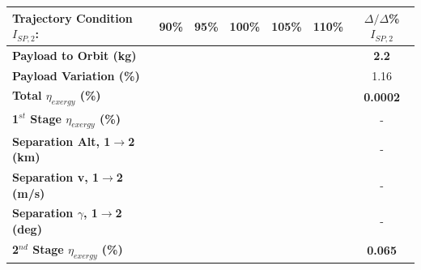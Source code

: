 \begin{table}[ht!]
	\centering
	\begin{tabular}{l c c c c c c} 
		\hline \textbf{Trajectory Condition}   \qquad  $I_{SP,2}$:
		&90\%
		&95\%
		&100\%
		&105\%
		&110\%
		& $\Delta/\Delta$\%$I_{SP,2}$
		\\
		\hline \textbf{Payload to Orbit (kg)}
		& \textbf{\PayloadToOrbitIspNinetyNoReturn}
		& \textbf{\PayloadToOrbitIspNinetyFiveNoReturn}
		& \textbf{\PayloadToOrbitIspStandardNoReturn}
		& \textbf{\PayloadToOrbitIspOneHundredFiveNoReturn}
		& \textbf{\PayloadToOrbitIspOneHundredTenNoReturn}
		&\textbf{2.2}
		\\
		\textbf{Payload Variation (\%)}
		& \PayloadVarIspNinetyNoReturn
		& \PayloadVarIspNinetyFiveNoReturn
		& \PayloadVarIspStandardNoReturn
		& \PayloadVarIspOneHundredFiveNoReturn
		& \PayloadVarIspOneHundredTenNoReturn
		&1.16
		\\
		\textbf{Total $\eta_{exergy}$ (\%)}
		& \textbf{\totalExergyEffIspNinetyNoReturn}
		& \textbf{\totalExergyEffIspNinetyFiveNoReturn}
		& \textbf{\totalExergyEffIspStandardNoReturn}
		& \textbf{\totalExergyEffIspOneHundredFiveNoReturn}
		& \textbf{\totalExergyEffIspOneHundredTenNoReturn}
		& \textbf{0.0002}
		\\
		\hline 
		\textbf{1$^{st}$ Stage $\eta_{exergy}$ (\%)}
		& \textbf{\firstExergyEffIspNinetyNoReturn}
		& \textbf{\firstExergyEffIspNinetyFiveNoReturn}
		& \textbf{\firstExergyEffIspStandardNoReturn}
		& \textbf{\firstExergyEffIspOneHundredFiveNoReturn}
		& \textbf{\firstExergyEffIspOneHundredTenNoReturn}
		& -
		\\

		\textbf{Separation Alt, 1$\rightarrow$2 (km)}
		& \firstsecondSeparationAltIspNinetyNoReturn
		& \firstsecondSeparationAltIspNinetyFiveNoReturn
		& \firstsecondSeparationAltIspStandardNoReturn
		& \firstsecondSeparationAltIspOneHundredFiveNoReturn
		& \firstsecondSeparationAltIspOneHundredTenNoReturn
		& -
		\\
		\textbf{Separation v, 1$\rightarrow$2 (m/s)}
		& \firstsecondSeparationvIspNinetyNoReturn
		& \firstsecondSeparationvIspNinetyFiveNoReturn
		& \firstsecondSeparationvIspStandardNoReturn
		& \firstsecondSeparationvIspOneHundredFiveNoReturn
		& \firstsecondSeparationvIspOneHundredTenNoReturn
		& -
		\\
		\textbf{Separation $\gamma$, 1$\rightarrow$2 (deg)}
		& \firstsecondSeparationgammaIspNinetyNoReturn
		& \firstsecondSeparationgammaIspNinetyFiveNoReturn
		& \firstsecondSeparationgammaIspStandardNoReturn
		& \firstsecondSeparationgammaIspOneHundredFiveNoReturn
		& \firstsecondSeparationgammaIspOneHundredTenNoReturn
		& -
		\\
		\hline 
		\textbf{2$^{nd}$ Stage $\eta_{exergy}$ (\%)}
		& \textbf{\secondExergyEffIspNinetyNoReturn}
		& \textbf{\secondExergyEffIspNinetyFiveNoReturn}
		& \textbf{\secondExergyEffIspStandardNoReturn}
		& \textbf{\secondExergyEffIspOneHundredFiveNoReturn}
		& \textbf{\secondExergyEffIspOneHundredTenNoReturn}
		& \textbf{0.065}
		\\
	

\end{tabular}
\end{table}

